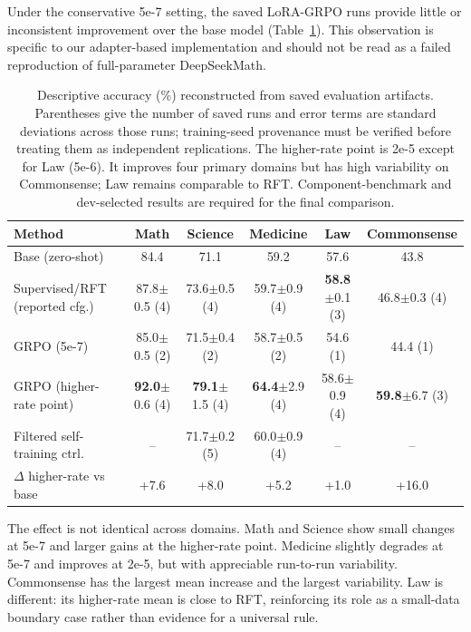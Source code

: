 \documentclass[11pt]{article}
\begin{document}
Under the conservative 5e-7 setting, the saved LoRA-GRPO runs provide little or inconsistent improvement over the base model (Table~\ref{tab:main}). This observation is specific to our adapter-based implementation and should not be read as a failed reproduction of full-parameter DeepSeekMath.

\begin{table}[t]
\centering
\small
\begin{tabular}{@{}lccccc@{}}
\toprule
\textbf{Method} & \textbf{Math} & \textbf{Science} & \textbf{Medicine} & \textbf{Law} & \textbf{Commonsense} \\
\midrule
Base (zero-shot) & 84.4 & 71.1 & 59.2 & 57.6 & 43.8 \\
Supervised/RFT (reported cfg.) & 87.8$\pm$0.5 (4) & 73.6$\pm$0.5 (4) & 59.7$\pm$0.9 (4) & \textbf{58.8}$\pm$0.1 (3) & 46.8$\pm$0.3 (4) \\
GRPO (5e-7) & 85.0$\pm$0.5 (2) & 71.5$\pm$0.4 (2) & 58.7$\pm$0.5 (2) & 54.6 (1) & 44.4 (1) \\
GRPO (higher-rate point) & \textbf{92.0}$\pm$0.6 (4) & \textbf{79.1}$\pm$1.5 (4) & \textbf{64.4}$\pm$2.9 (4) & 58.6$\pm$0.9 (4) & \textbf{59.8}$\pm$6.7 (3) \\
Filtered self-training ctrl. & -- & 71.7$\pm$0.2 (5) & 60.0$\pm$0.9 (4) & -- & -- \\
\midrule
$\Delta$ higher-rate vs base & +7.6 & +8.0 & +5.2 & +1.0 & +16.0 \\
\bottomrule
\end{tabular}
\caption{Descriptive accuracy (\%) reconstructed from saved evaluation artifacts. Parentheses give the number of saved runs and error terms are standard deviations across those runs; training-seed provenance must be verified before treating them as independent replications. The higher-rate point is 2e-5 except for Law (5e-6). It improves four primary domains but has high variability on Commonsense; Law remains comparable to RFT. Component-benchmark and dev-selected results are required for the final comparison.}
\label{tab:main}
\end{table}

The effect is not identical across domains. Math and Science show small changes at 5e-7 and larger gains at the higher-rate point. Medicine slightly degrades at 5e-7 and improves at 2e-5, but with appreciable run-to-run variability. Commonsense has the largest mean increase and the largest variability. Law is different: its higher-rate mean is close to RFT, reinforcing its role as a small-data boundary case rather than evidence for a universal rule.
\end{document}
